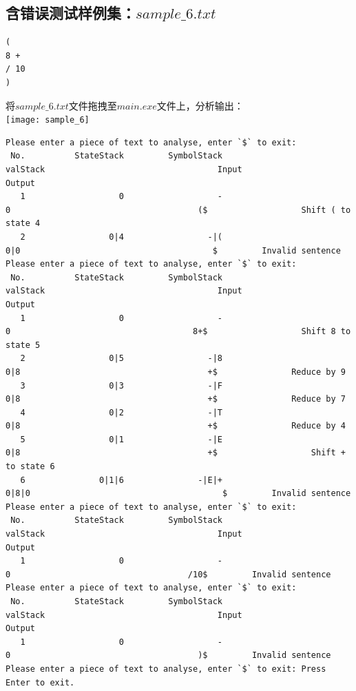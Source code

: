 \documentclass[UTF8]{ctexart}
\begin{document}
\subsection{含错误测试样例集：$sample\_6.txt$}
\begin{lstlisting}
( 
8 +
/ 10
)

    \end{lstlisting}
将$sample\_6.txt$文件拖拽至$main.exe$文件上，分析输出： \\
\texttt{[image: sample\_6]}
\begin{lstlisting}
Please enter a piece of text to analyse, enter `$` to exit:
 No.          StateStack         SymbolStack                      valStack                                   Input                   Output
   1                   0                   -                             0                                      ($                   Shift ( to state 4
   2                 0|4                 -|(                           0|0                                       $         Invalid sentence
Please enter a piece of text to analyse, enter `$` to exit:
 No.          StateStack         SymbolStack                      valStack                                   Input                   Output
   1                   0                   -                             0                                     8+$                   Shift 8 to state 5
   2                 0|5                 -|8                           0|8                                      +$               Reduce by 9
   3                 0|3                 -|F                           0|8                                      +$               Reduce by 7
   4                 0|2                 -|T                           0|8                                      +$               Reduce by 4
   5                 0|1                 -|E                           0|8                                      +$                   Shift + to state 6
   6               0|1|6               -|E|+                         0|8|0                                       $         Invalid sentence
Please enter a piece of text to analyse, enter `$` to exit:
 No.          StateStack         SymbolStack                      valStack                                   Input                   Output
   1                   0                   -                             0                                    /10$         Invalid sentence
Please enter a piece of text to analyse, enter `$` to exit:
 No.          StateStack         SymbolStack                      valStack                                   Input                   Output
   1                   0                   -                             0                                      )$         Invalid sentence
Please enter a piece of text to analyse, enter `$` to exit: Press Enter to exit.
    \end{lstlisting}
\end{document}
